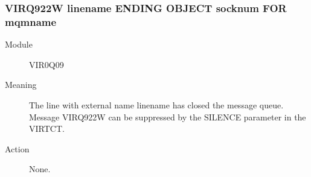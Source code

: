 \documentclass[letterpaper,10pt,english]{sphinxmanual}
\begin{document}
\subsubsection{VIRQ922W linename ENDING OBJECT socknum FOR mqmname}
\label{\detokenize{messages:virq922w-linename-ending-object-socknum-for-mqmname}}\begin{description}
\item[{Module}] \leavevmode
VIR0Q09

\item[{Meaning}] \leavevmode
The line with external name linename has closed the message queue. Message VIRQ922W can be suppressed by the SILENCE parameter in the VIRTCT.

\item[{Action}] \leavevmode
None.

\end{description}
\end{document}
